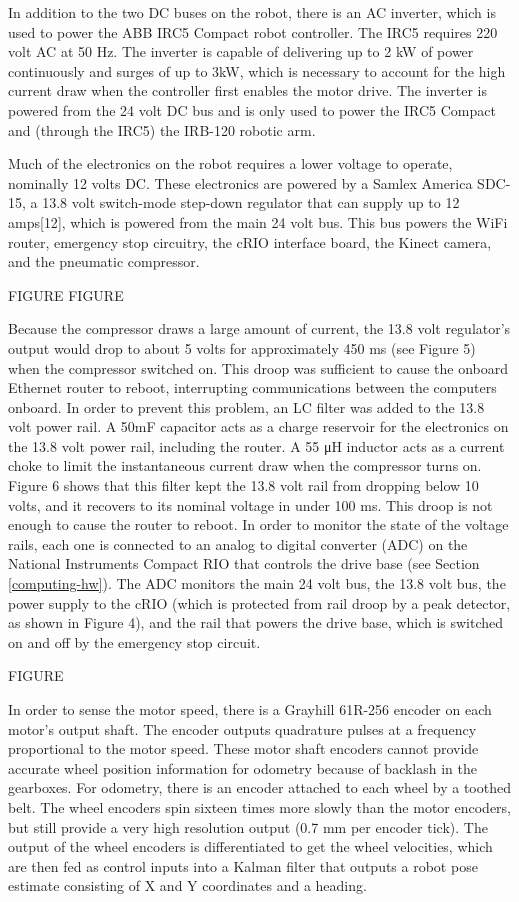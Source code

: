 \documentclass[]{cwru} %
\begin{document}
In addition to the two DC buses on the robot, there is an AC inverter,
which is used to power the ABB IRC5 Compact robot controller. The IRC5
requires 220 volt AC at 50 Hz. The inverter is capable of delivering up
to 2 kW of power continuously and surges of up to 3kW, which is
necessary to account for the high current draw when the controller first
enables the motor drive. The inverter is powered from the 24 volt DC bus
and is only used to power the IRC5 Compact and (through the IRC5) the
IRB-120 robotic arm.

Much of the electronics on the robot requires a lower voltage to
operate, nominally 12 volts DC. These electronics are powered by a
Samlex America SDC-15, a 13.8 volt switch-mode step-down regulator that
can supply up to 12 amps{[}12{]}, which is powered from the main 24 volt
bus. This bus powers the WiFi router, emergency stop circuitry, the cRIO
interface board, the Kinect camera, and the pneumatic compressor.

FIGURE FIGURE

Because the compressor draws a large amount of current, the 13.8 volt
regulator's output would drop to about 5 volts for approximately 450 ms
(see Figure 5) when the compressor switched on. This droop was
sufficient to cause the onboard Ethernet router to reboot, interrupting
communications between the computers onboard. In order to prevent this
problem, an LC filter was added to the 13.8 volt power rail. A 50mF
capacitor acts as a charge reservoir for the electronics on the 13.8
volt power rail, including the router. A 55 μH inductor acts as a
current choke to limit the instantaneous current draw when the
compressor turns on. Figure 6 shows that this filter kept the 13.8 volt
rail from dropping below 10 volts, and it recovers to its nominal
voltage in under 100 ms. This droop is not enough to cause the router to
reboot. In order to monitor the state of the voltage rails, each one is
connected to an analog to digital converter (ADC) on the National
Instruments Compact RIO that controls the drive base (see Section \ref{computing-hw}).
The ADC monitors the main 24 volt bus, the 13.8 volt bus, the power
supply to the cRIO (which is protected from rail droop by a peak
detector, as shown in Figure 4), and the rail that powers the drive
base, which is switched on and off by the emergency stop circuit.

FIGURE

In order to sense the motor speed, there is a Grayhill 61R-256 encoder
on each motor's output shaft. The encoder outputs quadrature pulses at a
frequency proportional to the motor speed. These motor shaft encoders
cannot provide accurate wheel position information for odometry because
of backlash in the gearboxes. For odometry, there is an encoder attached
to each wheel by a toothed belt. The wheel encoders spin sixteen times
more slowly than the motor encoders, but still provide a very high
resolution output (0.7 mm per encoder tick). The output of the wheel
encoders is differentiated to get the wheel velocities, which are then
fed as control inputs into a Kalman filter that outputs a robot pose
estimate consisting of X and Y coordinates and a heading.
\end{document}
